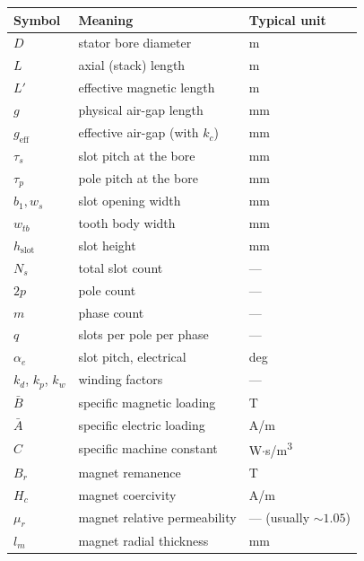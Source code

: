 \documentclass[12pt,a4paper]{article}
\begin{document}
\begin{table}[H]
  \centering
  \begin{tabular}{lll}
    \toprule
    Symbol & Meaning & Typical unit \\
    \midrule
    $D$         & stator bore diameter         & m \\
    $L$         & axial (stack) length         & m \\
    $L'$        & effective magnetic length    & m \\
    $g$         & physical air-gap length      & mm \\
    $g_\text{eff}$ & effective air-gap (with $k_c$) & mm \\
    $\tau_s$    & slot pitch at the bore       & mm \\
    $\tau_p$    & pole pitch at the bore       & mm \\
    $b_1, w_s$  & slot opening width           & mm \\
    $w_{tb}$    & tooth body width             & mm \\
    $h_\text{slot}$ & slot height               & mm \\
    $N_s$       & total slot count             & --- \\
    $2p$        & pole count                   & --- \\
    $m$         & phase count                  & --- \\
    $q$         & slots per pole per phase     & --- \\
    $\alpha_e$  & slot pitch, electrical       & deg \\
    $k_d$, $k_p$, $k_w$ & winding factors       & --- \\
    $\bar B$    & specific magnetic loading    & T \\
    $\bar A$    & specific electric loading    & A/m \\
    $C$         & specific machine constant    & W$\cdot$s/m\textsuperscript{3} \\
    $B_r$       & magnet remanence             & T \\
    $H_c$       & magnet coercivity            & A/m \\
    $\mu_r$     & magnet relative permeability & --- (usually $\sim 1.05$) \\
    $l_m$       & magnet radial thickness      & mm \\
    \bottomrule
  \end{tabular}
\end{table}
\end{document}

